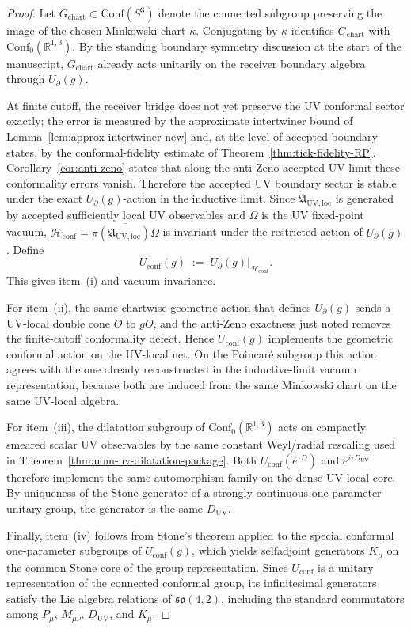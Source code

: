 \documentclass[10pt]{article}
\theoremstyle{definition}
\theoremstyle{plain}
\begin{document}
\begin{proof}
Let \(G_{\mathrm{chart}}\subset\mathrm{Conf}(S^3)\) denote the
connected subgroup preserving the image of the chosen Minkowski chart
\(\kappa\).  Conjugating by \(\kappa\) identifies
\(G_{\mathrm{chart}}\) with \(\mathrm{Conf}_0(\mathbb R^{1,3})\).  By
the standing boundary symmetry discussion at the start of the
manuscript, \(G_{\mathrm{chart}}\) already acts unitarily on the
receiver boundary algebra through \(U_\partial(g)\).

At finite cutoff, the receiver bridge does not yet preserve the UV
conformal sector exactly; the error is measured by the approximate
intertwiner bound of Lemma~\ref{lem:approx-intertwiner-new} and, at the
level of accepted boundary states, by the conformal-fidelity estimate of
Theorem~\ref{thm:tick-fidelity-RP}.  Corollary~\ref{cor:anti-zeno}
states that along the anti-Zeno accepted UV limit these conformality
errors vanish.  Therefore the accepted UV boundary sector is stable
under the exact \(U_\partial(g)\)-action in the inductive limit.  Since
\(\mathfrak A_{\mathrm{UV,loc}}\) is generated by accepted sufficiently
local UV observables and \(\Omega\) is the UV fixed-point vacuum,
\(\mathcal H_{\mathrm{conf}}
=\overline{\pi(\mathfrak A_{\mathrm{UV,loc}})\Omega}\) is invariant
under the restricted action of \(U_\partial(g)\).  Define
\[
U_{\mathrm{conf}}(g)
\;:=\;
U_\partial(g)\big|_{\mathcal H_{\mathrm{conf}}}.
\]
This gives item~\textnormal{(i)} and vacuum invariance.

For item~\textnormal{(ii)}, the same chartwise geometric action that
defines \(U_\partial(g)\) sends a UV-local double cone \(O\) to \(gO\),
and the anti-Zeno exactness just noted removes the finite-cutoff
conformality defect.  Hence \(U_{\mathrm{conf}}(g)\) implements the
geometric conformal action on the UV-local net.  On the Poincar\'e
subgroup this action agrees with the one already reconstructed in the
inductive-limit vacuum representation, because both are induced from the
same Minkowski chart on the same UV-local algebra.

For item~\textnormal{(iii)}, the dilatation subgroup of
\(\mathrm{Conf}_0(\mathbb R^{1,3})\) acts on compactly smeared scalar UV
observables by the same constant Weyl/radial rescaling used in
Theorem~\ref{thm:uom-uv-dilatation-package}.  Both
\(U_{\mathrm{conf}}(e^{\tau D})\) and \(e^{i\tau D_{\mathrm{UV}}}\)
therefore implement the same automorphism family on the dense
UV-local core.  By uniqueness of the Stone generator of a strongly
continuous one-parameter unitary group, the generator is the same
\(D_{\mathrm{UV}}\).

Finally, item~\textnormal{(iv)} follows from Stone's theorem applied to
the special conformal one-parameter subgroups of
\(U_{\mathrm{conf}}(g)\), which yields selfadjoint generators \(K_\mu\)
on the common Stone core of the group representation.  Since
\(U_{\mathrm{conf}}\) is a unitary representation of the connected
conformal group, its infinitesimal generators satisfy the Lie algebra
relations of \(\mathfrak{so}(4,2)\), including the standard commutators
among \(P_\mu\), \(M_{\mu\nu}\), \(D_{\mathrm{UV}}\), and \(K_\mu\).
\end{proof}
\end{document}
